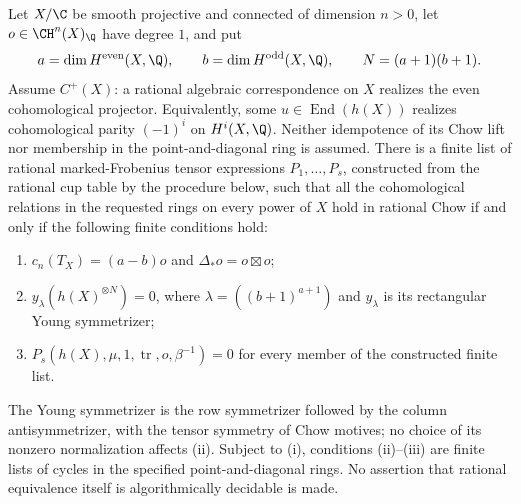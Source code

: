 \begin{theorem}
\label{c:finite-super-criterion}
Let $X/\C$ be smooth projective and connected of dimension $n>0$,
let $o\in\CH^n(X)_\Q$ have degree $1$, and put
\[
 a=\dim H^{\rm even}(X,\Q),\qquad
 b=\dim H^{\rm odd}(X,\Q),\qquad
 N=(a+1)(b+1).
\]
Assume $C^+(X)$: a rational algebraic correspondence on $X$ realizes
the even cohomological projector.  Equivalently, some
$u\in\operatorname{End}(h(X))$ realizes cohomological parity
$(-1)^i$ on $H^i(X,\Q)$.  Neither idempotence of its Chow lift nor
membership in the point-and-diagonal ring is assumed.
There is a finite list of rational marked-Frobenius tensor
expressions $P_1,\ldots,P_s$, constructed from the rational cup
table by the procedure below, such that all the cohomological
relations in the requested rings on every power of $X$ hold in
rational Chow if and only if the following finite conditions hold:
\begin{enumerate}[label=(\roman*)]
\item $c_n(T_X)=(a-b)o$ and $\Delta_*o=o\boxtimes o$;
\item $y_\lambda(h(X)^{\otimes N})=0$, where
      $\lambda=((b+1)^{a+1})$ and $y_\lambda$ is its rectangular
      Young symmetrizer;
\item $P_s(h(X),\mu,1,\operatorname{tr},o,\beta^{-1})=0$ for
      every member of the constructed finite list.
\end{enumerate}
The Young symmetrizer is the row symmetrizer followed by the column
antisymmetrizer, with the tensor symmetry of Chow motives; no
choice of its nonzero normalization affects (ii).
Subject to (i), conditions (ii)--(iii) are finite lists of cycles
in the specified point-and-diagonal rings.  No assertion that
rational equivalence itself is algorithmically decidable is made.
\end{theorem}

